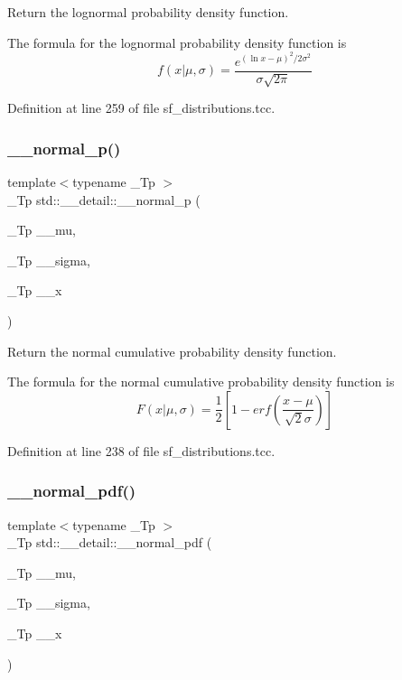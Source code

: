 Return the lognormal probability density function. 

The formula for the lognormal probability density function is \[ f(x|\mu,\sigma) = \frac{e^{(\ln{x}-\mu)^2/2\sigma^2}}{\sigma\sqrt{2\pi}} \] 

Definition at line 259 of file sf\+\_\+distributions.\+tcc.

\mbox{\label{namespacestd_1_1____detail_a4a088c2e6ddea7db99af9d114bf31b46}} 
\subsubsection{\texorpdfstring{\+\_\+\+\_\+normal\+\_\+p()}{\_\_normal\_p()}}
{\footnotesize\ttfamily template$<$typename \+\_\+\+Tp $>$ \\
\+\_\+\+Tp std\+::\+\_\+\+\_\+detail\+::\+\_\+\+\_\+normal\+\_\+p (\begin{DoxyParamCaption}\item[{\+\_\+\+Tp}]{\+\_\+\+\_\+mu,  }\item[{\+\_\+\+Tp}]{\+\_\+\+\_\+sigma,  }\item[{\+\_\+\+Tp}]{\+\_\+\+\_\+x }\end{DoxyParamCaption})}



Return the normal cumulative probability density function. 

The formula for the normal cumulative probability density function is \[ F(x|\mu,\sigma) = \frac{1}{2}\left[ 1-erf(\frac{x-\mu}{\sqrt{2}\sigma}) \right] \] 

Definition at line 238 of file sf\+\_\+distributions.\+tcc.

\mbox{\label{namespacestd_1_1____detail_a6211a0741c8e2dfb219fb52d072295f4}} 
\subsubsection{\texorpdfstring{\+\_\+\+\_\+normal\+\_\+pdf()}{\_\_normal\_pdf()}}
{\footnotesize\ttfamily template$<$typename \+\_\+\+Tp $>$ \\
\+\_\+\+Tp std\+::\+\_\+\+\_\+detail\+::\+\_\+\+\_\+normal\+\_\+pdf (\begin{DoxyParamCaption}\item[{\+\_\+\+Tp}]{\+\_\+\+\_\+mu,  }\item[{\+\_\+\+Tp}]{\+\_\+\+\_\+sigma,  }\item[{\+\_\+\+Tp}]{\+\_\+\+\_\+x }\end{DoxyParamCaption})}



